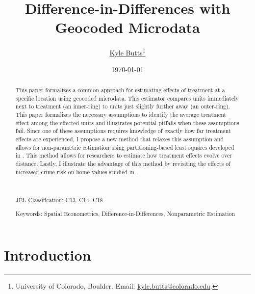 \documentclass[10pt]{article}
\title{Difference-in-Differences with Geocoded Microdata}
\author{\href{https://kylebutts.com/}{Kyle Butts}\thanks{University of Colorado, Boulder. Email: \href{mailto:kyle.butts@colorado.edu}{kyle.butts@colorado.edu}.} %
}
\date{\today}
\begin{document}
\begin{titlepage}
\maketitle

\begin{abstract}
    This paper formalizes a common approach for estimating effects of treatment at a specific location using geocoded microdata. This estimator compares units immediately next to treatment (an inner-ring) to units just slightly further away (an outer-ring). This paper formalizes the necessary assumptions to identify the average treatment effect among the effected units and illustrates potential pitfalls when these assumptions fail. Since one of these assumptions requires knowledge of exactly how far treatment effects are experienced, I propose a new method that relaxes this assumption and allows for non-parametric estimation using partitioning-based least squares developed in \citet{Cattaneo_Crump_Farrell_Feng_2019}. This method allows for researchers to estimate how treatment effects evolve over distance. Lastly, I illustrate the advantage of this method by revisiting the effects of increased crime risk on home values studied in \citet{Linden_Rockoff_2008}. 

    \par~\par\noindent
    {\color{asher}JEL-Classification:} C13, C14, C18
    \par\noindent
    {\color{asher}Keywords:} Spatial Econometrics, Difference-in-Differences, Nonparametric Estimation
    \par\vspace{-2.5mm}
\end{abstract}
\end{titlepage}


\section{Introduction}
\end{document}
